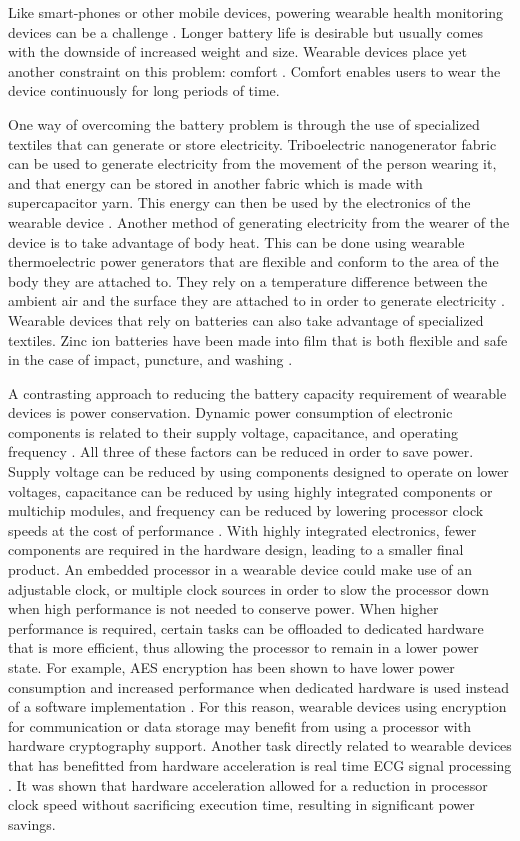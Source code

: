Like smart-phones or other mobile devices, powering wearable health monitoring
devices can be a challenge \cite{Pantelopoulos2010}.  Longer battery life is 
desirable but usually comes with the downside of increased weight and size.  
Wearable devices place yet another constraint on this problem: comfort 
\cite{Motti2014}.  Comfort enables users to wear the device continuously for 
long periods of time.  

One way of overcoming the battery problem is through the use of 
specialized textiles that can generate or store electricity.  Triboelectric 
nanogenerator fabric can be used to generate electricity from the movement of 
the person wearing it, and that energy can be stored in another fabric which 
is made with supercapacitor yarn.  This energy can then be used by the 
electronics of the wearable device \cite{Pu2016}.  Another method of generating 
electricity from the wearer of the device is to take advantage of body heat.  
This can be done using wearable thermoelectric power generators that are flexible 
and conform to the area of the body they are attached to.  They rely on a 
temperature difference between the ambient air and the surface they are attached 
to in order to generate electricity \cite{Siddique2017}.  Wearable devices that 
rely on batteries can also take advantage of specialized textiles.  Zinc ion 
batteries have been made into film that is both flexible and safe in the case 
of impact, puncture, and washing \cite{Li2018}.

A contrasting approach to reducing the battery capacity requirement of wearable 
devices is power conservation.  Dynamic power consumption of electronic 
components is related to their supply voltage, capacitance, and operating 
frequency \cite{Forman1994}. All three of these factors can be reduced in order 
to save power.  Supply voltage can be reduced by using components designed to 
operate on lower voltages, capacitance can be reduced by using highly integrated 
components or multichip modules, and frequency can be reduced by lowering 
processor clock speeds at the cost of performance \cite{Forman1994}. With highly integrated electronics, fewer components are required in the hardware design, leading to 
a smaller final product.  An embedded processor in a wearable device could make 
use of an adjustable clock, or multiple clock sources in order to slow the 
processor down when high performance is not needed to conserve power. When higher performance is required, certain tasks can be offloaded to dedicated
hardware that is more efficient, thus allowing the processor to remain in a 
lower power state.  For example, AES encryption has been shown to have lower 
power consumption and increased performance when dedicated hardware is used
instead of a software implementation \cite{Hamalainen2006}.  For this reason,
wearable devices using encryption for communication or data storage may 
benefit from using a processor with hardware cryptography support. Another task
directly related to wearable devices that has benefitted from hardware 
acceleration is real time ECG signal processing \cite{Cardarilli2018}. It was 
shown that hardware acceleration allowed for a reduction in processor clock 
speed without sacrificing execution time, resulting in significant power 
savings.

